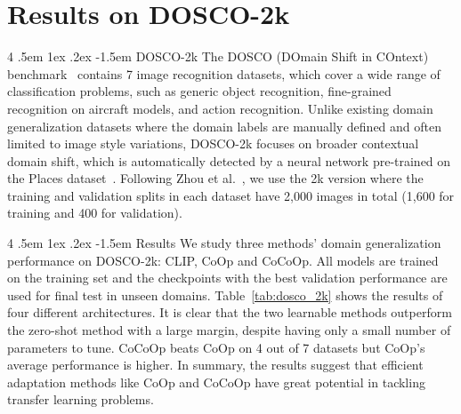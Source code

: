 \documentclass[10pt,twocolumn,letterpaper]{article}
\makeatletter
\renewcommand\paragraph{
  \@startsection{paragraph} %
  {4} %
  {\z@} %
  {.5em \@plus1ex \@minus.2ex} %
  {-1.5em} %
  {\normalfont\normalsize\bfseries} %
}
\makeatother
\begin{document}
\section{Results on DOSCO-2k}

\paragraph{DOSCO-2k}
The DOSCO (DOmain Shift in COntext) benchmark~\cite{zhou2022device} contains 7 image recognition datasets, which cover a wide range of classification problems, such as generic object recognition, fine-grained recognition on aircraft models, and action recognition. Unlike existing domain generalization datasets where the domain labels are manually defined and often limited to image style variations, DOSCO-2k focuses on broader contextual domain shift, which is automatically detected by a neural network pre-trained on the Places dataset~\cite{zhou2017places}. Following Zhou et al.~\cite{zhou2022device}, we use the 2k version where the training and validation splits in each dataset have 2,000 images in total (1,600 for training and 400 for validation).

\paragraph{Results}
We study three methods' domain generalization performance on DOSCO-2k: CLIP, CoOp and CoCoOp. All models are trained on the training set and the checkpoints with the best validation performance are used for final test in unseen domains. Table~\ref{tab:dosco_2k} shows the results of four different architectures. It is clear that the two learnable methods outperform the zero-shot method with a large margin, despite having only a small number of parameters to tune. CoCoOp beats CoOp on 4 out of 7 datasets but CoOp's average performance is higher. In summary, the results suggest that efficient adaptation methods like CoOp and CoCoOp have great potential in tackling transfer learning problems.



{\small


}
\end{document}
